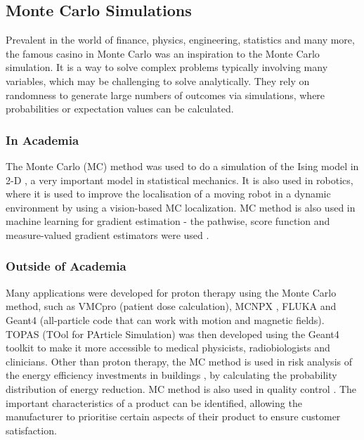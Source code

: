\documentclass[10pt, twocolumn]{article}
\begin{document}
\subsection{Monte Carlo Simulations} %
Prevalent in the world of finance, physics, engineering, statistics and many more, the famous casino in Monte Carlo was an inspiration to the Monte Carlo simulation. It is a way to solve complex problems typically involving many variables, which may be challenging to solve analytically. They rely on randomness to generate large numbers of outcomes via simulations, where probabilities or expectation values can be calculated.

\subsubsection{In Academia} %
The Monte Carlo (MC) method was used to do a simulation of the Ising model in 2-D \cite{Shekaari2021}\cite{Jindal2007}, a very important model in statistical mechanics. It is also used in robotics, where it is used to improve the localisation of a moving robot in a dynamic environment \cite{Zhao2008} by using a vision-based MC localization. MC method is also used in machine learning for gradient estimation - the pathwise, score function and measure-valued gradient estimators were used \cite{Mohamed2020}.

\subsubsection{Outside of Academia} %
Many applications were developed for proton therapy using the Monte Carlo method, such as VMCpro \cite{FippelSoukup2004} (patient dose calculation), MCNPX \cite{Waters2002}, FLUKA \cite{Ferrari2005} and Geant4 \cite{Geant4} \cite{Geant4_2} (all-particle code that can work with motion and magnetic fields). TOPAS (TOol for PArticle Simulation) \cite{Perl2012}\cite{Faddegon2020} was then developed using the Geant4 toolkit to make it more accessible to medical physicists, radiobiologists and clinicians. Other than proton therapy, the MC method is used in risk analysis of the energy efficiency investments in buildings \cite{Togashi2019}, by calculating the probability distribution of energy reduction. MC method is also used in quality control \cite{Moran2023}. The important characteristics of a product can be identified, allowing the manufacturer to prioritise certain aspects of their product to ensure customer satisfaction.
\end{document}
